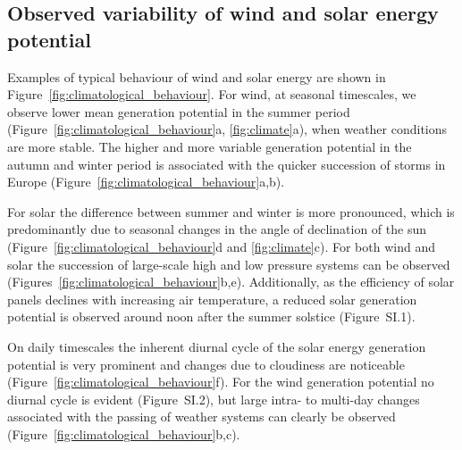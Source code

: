 \documentclass[12pt]{iopart}
\begin{document}

\subsection{Observed variability of wind and solar energy potential}\label{secCP2:variability}
Examples of typical behaviour of wind and solar energy are shown in Figure~\ref{fig:climatological_behaviour}. 
For wind, at seasonal timescales, we observe lower mean generation potential in the summer period (Figure~\ref{fig:climatological_behaviour}a, \ref{fig:climate}a), when weather conditions are more stable. 
The higher and more variable generation potential in the autumn and winter period is associated with the quicker succession of storms in Europe (Figure~\ref{fig:climatological_behaviour}a,b).

For solar the difference between summer and winter is more pronounced, which is predominantly due to seasonal changes in the angle of declination of the sun (Figure~\ref{fig:climatological_behaviour}d and \ref{fig:climate}c). 
For both wind and solar the succession of large-scale high and low pressure systems can be observed (Figures~\ref{fig:climatological_behaviour}b,e). 
Additionally, as the efficiency of solar panels declines with increasing air temperature, a reduced solar generation potential is observed around noon after the summer solstice (Figure~SI.1). 

On daily timescales the inherent diurnal cycle of the solar energy generation potential is very prominent and changes due to cloudiness are noticeable (Figure~\ref{fig:climatological_behaviour}f). 
For the wind generation potential no diurnal cycle is evident (Figure~SI.2), but large intra- to multi-day changes associated with the passing of weather systems can clearly be observed (Figure~\ref{fig:climatological_behaviour}b,c).
\end{document}
